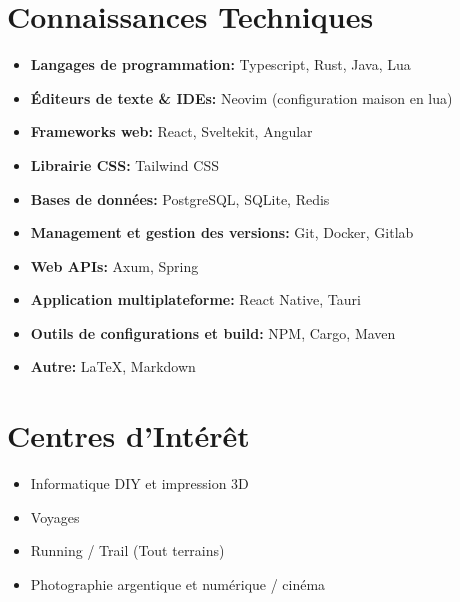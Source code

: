 \documentclass[10pt,a4paper,oneside]{article}
\begin{document}
\begin{multicols}{2}
\section*{Connaissances Techniques}
\begin{itemize}
    \item \textbf{Langages de programmation:} Typescript, Rust, Java, Lua
    \item \textbf{Éditeurs de texte \& IDEs:} Neovim (configuration maison en lua)
    \item \textbf{Frameworks web:} React, Sveltekit, Angular
    \item \textbf{Librairie CSS:} Tailwind CSS
    \item \textbf{Bases de données:} PostgreSQL, SQLite, Redis
    \item \textbf{Management et gestion des versions:} Git, Docker, Gitlab
    \item \textbf{Web APIs:} Axum, Spring
    \item \textbf{Application multiplateforme:} React Native, Tauri
    \item \textbf{Outils de configurations et build:} NPM, Cargo, Maven
    \item \textbf{Autre:} LaTeX, Markdown
\end{itemize}

\section*{Centres d’Intérêt}
\begin{itemize}
    \item Informatique DIY et impression 3D
    \item Voyages
    \item Running / Trail (Tout terrains)
    \item Photographie argentique et numérique / cinéma
\end{itemize}

\end{multicols}
\end{document}
